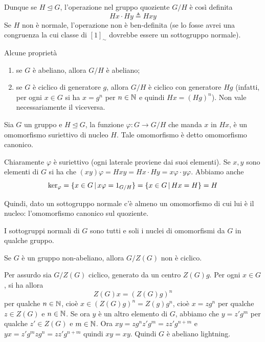 \documentclass[a4paper]{article}
\begin{document}
Dunque se \(H \unlhd G\), l'operazione nel gruppo quoziente \(G/H\) è così definita
\[
    Hx \cdot Hy \triangleq Hxy
\]
Se \(H\) non è normale, l'operazione non è ben-definita (se lo fosse avrei una congruenza la cui classe
di \({[1]}_\sim\) dovrebbe essere un sottogruppo normale).

\begin{snippetproposition}{Alcune proprietà}
    \begin{enumerate}
        \item se \(G\) è abeliano, allora \(G/H\) è abeliano;
        \item se \(G\) è ciclico di generatore \(g\), allora \(G/H\) è ciclico
        con generatore \(Hg\) (infatti, per ogni \(x\in G\) si ha \(x =g^n\)
        per \(n\in\mathbb{N}\) e quindi \(Hx = {(Hg)}^n\)).
        Non vale necessariamente il viceversa.
    \end{enumerate}
\end{snippetproposition}

\begin{snippetproposition}{}
    Sia \(G\) un gruppo e \(H \unlhd G\),
    la funzione \(\varphi \colon G \to G/H\) che manda
    \(x\) in \(Hx\), è un omomorfismo suriettivo di nucleo \(H\).
    Tale omomorfismo è detto omomorfismo canonico.
\end{snippetproposition}

\begin{snippetproof}{}
    Chiaramente \(\varphi\) è suriettivo (ogni laterale proviene dai suoi elementi).
    Se \(x,y\) sono elementi di \(G\) si ha che \((xy)\varphi = Hxy = Hx \cdot Hy = x\varphi \cdot y\varphi\).
    Abbiamo anche
    \[
        \text{ker}_\varphi = \{x \in G \,|\, x\varphi = 1_{G/H}\}
        = \{x\in G \,|\, Hx = H\} = H
    \]
\end{snippetproof}

Quindi, dato un sottogruppo normale c'è almeno un omomorfismo di cui lui è il nucleo: l'omomorfismo
canonico sul quoziente.

I sottogruppi normali di \(G\) sono tutti e soli i nuclei di omomorfismi da \(G\)
in qualche gruppo.

\begin{snippetproposition}{}
    Se \(G\) è un gruppo non-abeliano,
    allora \(G / Z(G)\) non è ciclico.
\end{snippetproposition}

\begin{snippetproof}{}
    Per assurdo sia \(G/Z(G)\) ciclico, generato da un centro
    \(Z(G)g\). Per ogni \(x\in G\), si ha allora
    \[
        Z(G)x = {(Z(G) g)}^n
    \]
    per qualche \(n\in\mathbb{N}\), cioè \(x \in {(Z(G) g)}^n = Z(g)g^n\),
    cioè \(x = zg^n\) per qualche \(z\in Z(G)\) e \(n\in\mathbb{N}\).
    Se ora \(y\) è un altro elemento di \(G\), abbiamo che \(y=z'g^m\)
    per qualche \(z'\in Z(G)\) e \(m\in\mathbb{N}\).
    Ora \(xy = zg^nz'g^m = zz'g^{n+m}\) e \(yx = z'g^mzg^n = zz'g^{n+m}\) quindi \(xy=xy\).
    Quindi \(G\) è abeliano lightning.
\end{snippetproof}
\end{document}
